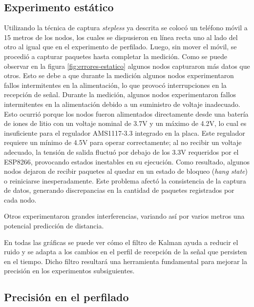 \subsection{Experimento estático}

 Utilizando la técnica de captura \textit{stepless} ya descrita se colocó un teléfono móvil a 15 metros de los nodos, los cuales se dispusieron en línea recta uno al lado del otro al igual que en el experimento de perfilado.
 Luego, sin mover el móvil, se procedió a capturar paquetes hasta completar la medición.
 Como se puede observar en la figura \ref{fig:errores-estatico} algunos nodos capturaron más datos que otros. Esto se debe a que durante la medición algunos nodos experimentaron fallos intermitentes en la alimentación, lo que provocó interrupciones en la recepción de señal. Durante la medición, algunos nodos experimentaron fallos intermitentes en la alimentación debido a un suministro de voltaje inadecuado. Esto ocurrió porque los nodos fueron alimentados directamente desde una batería de iones de litio con un voltaje nominal de 3.7V y un máximo de 4.2V, lo cual es insuficiente para el regulador AMS1117-3.3 integrado en la placa. Este regulador requiere un mínimo de 4.5V para operar correctamente; al no recibir un voltaje adecuado, la tensión de salida fluctuó por debajo de los 3.3V requeridos por el ESP8266, provocando estados inestables en su ejecución. Como resultado, algunos nodos dejaron de recibir paquetes al quedar en un estado de bloqueo (\textit{hang state}) o reiniciarse inesperadamente. Este problema afectó la consistencia de la captura de datos, generando discrepancias en la cantidad de paquetes registrados por cada nodo.

Otros experimentaron grandes interferencias, variando así por varios metros una potencial predicción de distancia.

 En todas las gráficas se puede ver cómo el filtro de Kalman ayuda a reducir el ruido y se adapta a los cambios en el perfil de recepción de la señal que persisten en el tiempo.
 Dicho filtro resultará una herramienta fundamental para mejorar la precisión en los experimentos subsiguientes.

\subsection{Precisión en el perfilado}



